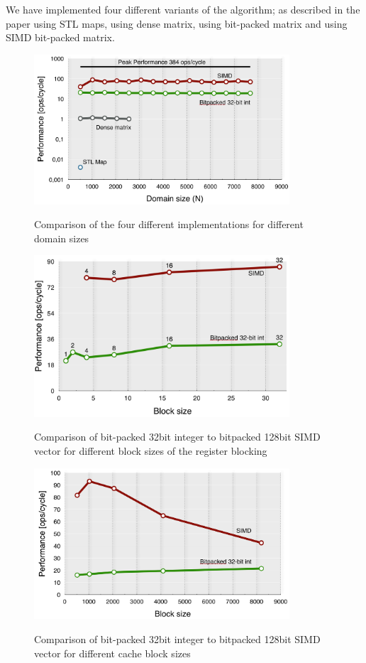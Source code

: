 \documentclass[letterpaper]{article}
\begin{document}
We have implemented four different variants of the algorithm; as described in the paper using STL maps, using dense matrix, using bit-packed matrix and using SIMD bit-packed matrix. 

\begin{figure}
  \centering
  \includegraphics[width=0.85\textwidth]{graphs/Domain_size.png}
  \label{fig:benchmarking-results}
  \caption{Comparison of the four different implementations for different domain sizes}
\end{figure}

\begin{figure}
  \centering
  \includegraphics[width=0.85\textwidth]{graphs/UALL.png}
  \label{fig:benchmarking-uall}
  \caption{Comparison of bit-packed 32bit integer to bitpacked 128bit SIMD vector for different block sizes of the register blocking}
\end{figure}

\begin{figure}
  \centering
  \includegraphics[width=0.85\textwidth]{graphs/Cache_size.png}
  \label{fig:benchmarking-cache}
  \caption{Comparison of bit-packed 32bit integer to bitpacked 128bit SIMD vector for different cache block sizes}
\end{figure}
\end{document}
